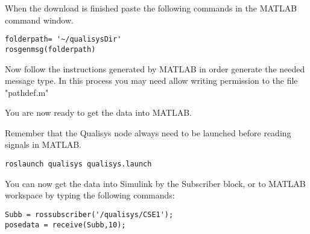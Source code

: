 \documentclass[12pt,a4paper,twoside]{report}
\begin{document}
When the download is finished paste the following commands in the MATLAB command window. 
\begin{lstlisting}[style=BashInputStyle]
folderpath= '~/qualisysDir'
rosgenmsg(folderpath)
\end{lstlisting}
Now follow the instructions generated by MATLAB in order generate the needed message type. In this process  you may need allow writing permission to the file "pathdef.m" 

You are now ready to get the data into MATLAB. 

Remember that the Qualisys node always need to be launched before reading signals in MATLAB.
\begin{lstlisting}[style=BashInputStyle]
roslaunch qualisys qualisys.launch
\end{lstlisting}

You can now get the data into Simulink by the Subscriber block, or to MATLAB workspace by typing the following commands: 

\begin{lstlisting}[style=BashInputStyle]
Subb = rossubscriber('/qualisys/CSE1');
posedata = receive(Subb,10);
\end{lstlisting}







  
\nocite{*}
\end{document}
